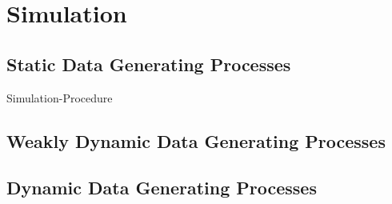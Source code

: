 \section{Simulation}

\subsection{Static Data Generating Processes}

Simulation-Procedure


\subsection{Weakly Dynamic Data Generating Processes}
\subsection{Dynamic Data Generating Processes}
